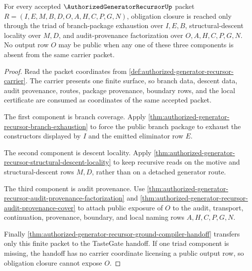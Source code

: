\begin{theorem}
\label{thm:authorized-generator-recursor-obligation-triad}
For every accepted $\AuthorizedGeneratorRecursorUp$ packet
$R=(I,E,M,B,D,O,A,H,C,P,G,N)$, obligation closure is reached only through the
triad of branch-package exhaustion over $I,E,B$, structural-descent locality
over $M,D$, and audit-provenance factorization over $O,A,H,C,P,G,N$. No output
row $O$ may be public when any one of these three components is absent from the
same carrier packet.
\end{theorem}
\begin{proof}
Read the packet coordinates from
\autoref{def:authorized-generator-recursor-carrier}. The carrier presents one
finite surface, so branch data, descent data, audit provenance, routes,
package provenance, boundary rows, and the local certificate are consumed as
coordinates of the same accepted packet.

The first component is branch coverage. Apply
\autoref{thm:authorized-generator-recursor-branch-exhaustion} to force the
public branch package to exhaust the constructors displayed by $I$ and the
emitted eliminator row $E$.

The second component is descent locality. Apply
\autoref{thm:authorized-generator-recursor-structural-descent-locality} to
keep recursive reads on the motive and structural-descent rows $M,D$, rather
than on a detached generator route.

The third component is audit provenance. Use
\autoref{thm:authorized-generator-recursor-audit-provenance-factorization} and
\autoref{thm:authorized-generator-recursor-audit-provenance-cover} to attach
public exposure of $O$ to the audit, transport, continuation, provenance,
boundary, and local naming rows $A,H,C,P,G,N$.

Finally
\autoref{thm:authorized-generator-recursor-ground-compiler-handoff} transfers
only this finite packet to the TasteGate handoff. If one triad component is
missing, the handoff has no carrier coordinate licensing a public output row,
so obligation closure cannot expose $O$.
\end{proof}

